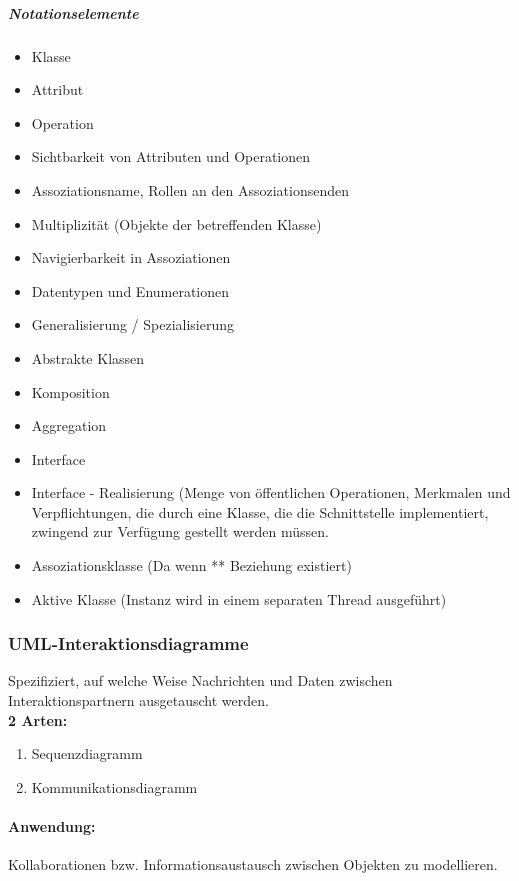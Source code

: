 \documentclass[../ZF_SWEN1.tex]{subfiles}
\begin{document}
\subparagraph{Notationselemente}
\begin{itemize}
	\item Klasse
	\item Attribut
	\item Operation
	\item Sichtbarkeit von Attributen und Operationen
	\item Assoziationsname, Rollen an den Assoziationsenden
	\item Multiplizität (Objekte der betreffenden Klasse)
	\item Navigierbarkeit in Assoziationen
	\item Datentypen und Enumerationen
	\item Generalisierung / Spezialisierung
	\item Abstrakte Klassen
	\item Komposition
	\item Aggregation
	\item Interface
	\item Interface - Realisierung (Menge von öffentlichen Operationen, Merkmalen und Verpflichtungen, die durch eine Klasse, die die Schnittstelle implementiert, zwingend zur Verfügung gestellt werden müssen.
	\item Assoziationsklasse (Da wenn ** Beziehung existiert)
	\item Aktive Klasse (Instanz wird in einem separaten Thread ausgeführt)
\end{itemize}

\subsubsection{UML-Interaktionsdiagramme}

Spezifiziert, auf welche Weise Nachrichten und Daten zwischen Interaktionspartnern ausgetauscht werden. \\

\textcolor {WildStrawberry}{\textbf{2 Arten:}}
\begin{enumerate}
	\item Sequenzdiagramm
	\item Kommunikationsdiagramm
\end{enumerate}

\paragraph{\textcolor {WildStrawberry}{\textbf{Anwendung:}}} Kollaborationen bzw. Informationsaustausch zwischen Objekten zu modellieren.
\end{document}
